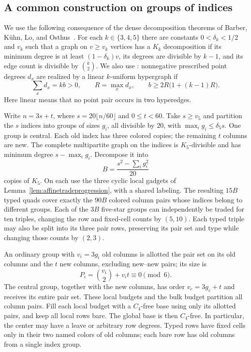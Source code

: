 \documentclass[11pt]{article}
\begin{document}
\subsection{A common construction on groups of indices}\label{sec:frame}
We use the following consequence of the dense decomposition theorems
of Barber, K\"uhn, Lo, and Osthus~\cite{densedecomp}.
For each $k\in\{3,4,5\}$ there are constants $0<\delta_k<1/2$ and $v_k$
such that a graph on $v\ge v_k$ vertices has a $K_k$ decomposition
if its minimum degree is at least $(1-\delta_k)v$, its degrees are
divisible by $k-1$, and its edge count is divisible by $\binom k2$.
We also use \cite[Lemma 3.5]{chm-unbalanced}: nonnegative prescribed
point degrees $d_x$ are realized by a linear $k$-uniform hypergraph if
\begin{equation}\label{eq:prescribeddegrees}
 \sum_xd_x=kb>0,\qquad R=\max_xd_x,
 \qquad b\ge2R\bigl(1+(k-1)R\bigr).
\end{equation}
Here linear means that no point pair occurs in two hyperedges.

Write $n=3s+t$, where $s=20\lfloor n/60\rfloor$ and $0\le t<60$.
Take $s\ge v_5$ and partition the $s$ indices into groups of sizes $g_i$, all divisible by
$20$, with $\max_i g_i\le\delta_5s$. One group is central. Each old index has
three colored copies; the remaining $t$ columns are new.
The complete multipartite graph on the indices is $K_5$-divisible and
has minimum degree $s-\max_i g_i$. Decompose it into
\[
 B=\frac{s^2-\sum_i g_i^2}{20}
\]
copies of $K_5$. On each use the three cyclic local gadgets of
Lemma~\ref{lem:affinetradeprogression}, with a shared labeling.
The resulting $15B$ typed quads cover exactly the $90B$ colored column
pairs whose indices belong to different groups. Each of the $3B$
five-star groups can independently be traded for ten triples, changing
the row and fixed-cell counts by $(5,10)$.
Each typed triple may also be split into its three pair rows, preserving
its pair set and type while changing those counts by $(2,3)$.

An ordinary group with $v_i=3g_i$ old columns is allotted the pair set
on its old columns and the $t$ new columns, excluding new--new pairs;
its size is
\[
 P_i=\binom{v_i}{2}+v_it\equiv0\pmod6.
\]
The central group, together with the new columns, has order
$v_c=3g_c+t$ and receives its entire pair set. These local budgets and
the bulk budget partition all column pairs. Fill each local budget with
a $C_4$-free base using only its allotted pairs, and keep all local rows
bare. The global base is then $C_4$-free. In particular, the center may
have a leave or arbitrary row degrees.
Typed rows have fixed cells only in their two named colors of old columns;
each bare row has old columns from a single index group.
\end{document}
